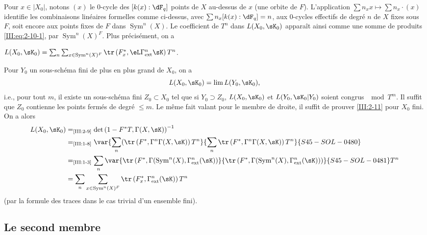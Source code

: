 Pour $x\in |X_0|$, notons $(x)$ le $0$-cycle des $[k(x):\dF_q]$ points de $X$ 
au-dessus de $x$ (une orbite de $F$). L'application 
$\sum n_x x\mapsto \sum n_x\cdot (x)$ identifie les combinaisons linéaires 
formelles comme ci-dessus, avec $\sum n_x [k(x):\dF_q]=n$, aux $0$-cycles 
effectifs de degré $n$ de $X$ fixes sous $F$, soit encore aux points fixes de 
$F$ dans $\operatorname{Sym}^n(X)$. Le coefficient de $T^n$ dans $L(X_0,\sK_0)$ 
apparaît ainsi comme une somme de produits \eqref{III:eq:2-10-1},  
par $\operatorname{Sym}^n(X)^F$. Plus précisément, on a 





\begin{lemma_}\label{III:2-11}
 $L(X_0,\sK_0) = \sum_n \sum_{x\in\operatorname{Sym}^n(X)^F} \tr\left(F_x^*,\eL\Gamma_\textnormal{ext}^n \sK\right) T^n$.
\end{lemma_}

Pour $Y_0$ un sous-schéma fini de plus en plus grand de $X_0$, on a 
\[
  L(X_0,\sK_0) = \lim L(Y_0,\sK_0) \text{,}
\]
i.e., pour tout $m$, il existe un sous-schéma fini $Z_0\subset X_0$ tel que 
si $Y_0\supset Z_0$, $L(X_0,\sK_0)$ et $L(Y_0,\sK_0|Y_0)$ soient congrus 
$\mod T^m$. 
Il suffit que $Z_0$ contienne les points fermés de degré $\leqslant m$. 
Le même fait valant pour le membre de droite, il suffit de prouver 
\ref{III:2-11} pour $X_0$ fini. On a alors 
\begin{align*}
  L(X_0,\sK_0) 
    &=_\text{\ref{III:2-9}} \det\left(1-F^* T,\Gamma(X,\sK)\right)^{-1} \\
    &=_\text{\ref{III:1-8}} \var{\sum_n (\tr\left(F^*,\Gamma^n \Gamma(X,\sK)\right) T^n}{\sum_n \tr\left(F^*,\Gamma^n \Gamma(X,\sK)\right) T^n}{S45-SOL-0480} \\
    &=_\text{\ref{III:1-3}} \sum_n \var{\tr\left(F^*,\Gamma(\operatorname{Sym}^n(X),\Gamma_\text{ext}^n(\sK)\right)}{\tr\left(F^*,\Gamma(\operatorname{Sym}^n(X),\Gamma_\text{ext}^n(\sK))\right)}{S45-SOL-0481} T^n \\
    &= \sum_n \sum_{x\in \operatorname{Sym}^n(X)^F} \tr\left(F_x^*,\Gamma_\text{ext}^n(\sK)\right) T^n
\end{align*}
(par la formule des traces dans le cas trivial d'un ensemble fini). 





\subsection{Le second membre}\label{III:2-12}

